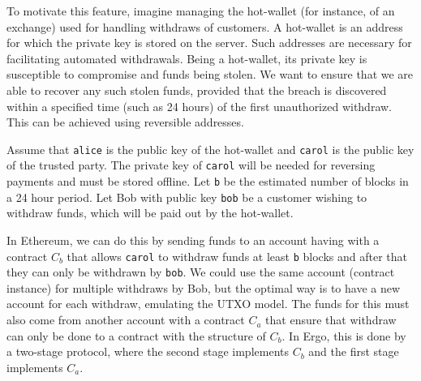 \documentclass[runningheads]{llncs}
\newcommand{\langname}{ErgoScript\xspace}
\begin{document}
To motivate this feature, imagine managing the hot-wallet (for instance, of an exchange) used for handling withdraws of customers. A hot-wallet is an address for which the private key is stored on the server. Such addresses are necessary for facilitating automated withdrawals. Being a hot-wallet, its private key is susceptible to compromise and funds being stolen. 
We want to ensure that we are able to recover any such stolen funds, provided that the breach is discovered within a specified time (such as 24 hours) of the first unauthorized withdraw. This can be achieved using reversible addresses.


Assume that \texttt{alice} is the public key of the hot-wallet and \texttt{carol} is the public key of the trusted party. The private key of \texttt{carol} will be needed for reversing payments and must be stored offline. Let \texttt{b} be the estimated number of blocks in a 24 hour period. 
Let Bob with public key \texttt{bob} be a customer wishing to withdraw funds, which will be paid out by the hot-wallet. 

In Ethereum, we can do this by sending funds to an account having with a contract $C_{b}$ that allows \texttt{carol} to withdraw funds at least \texttt{b} blocks and after that they can only be withdrawn by \texttt{bob}. We could use the same account (contract instance) for multiple withdraws by Bob, but the optimal way is to have a new account for each withdraw, emulating the UTXO model. The funds for this must also come from another account with a contract $C_{a}$ that ensure that withdraw can only be done to a contract with the structure of $C_{b}$. 
In Ergo, this is done by a two-stage protocol, where the second stage implements $C_{b}$ and the first stage implements $C_{a}$. 
\end{document}
